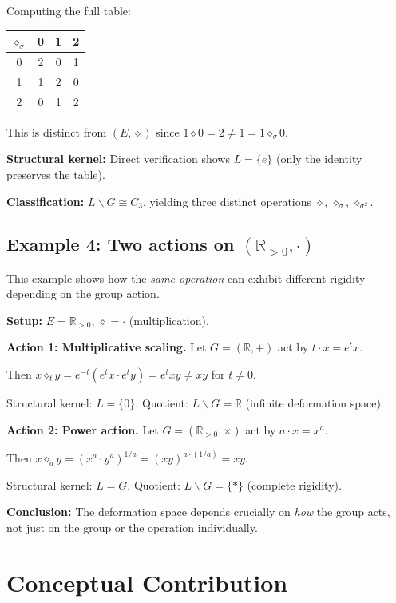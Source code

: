 \documentclass[11pt,a4paper]{article}
\begin{document}
	Computing the full table:
	\begin{center}
		\begin{tabular}{c|ccc}
			$\diamond_\sigma$ & 0 & 1 & 2 \\ \hline
			0 & 2 & 0 & 1 \\
			1 & 1 & 2 & 0 \\
			2 & 0 & 1 & 2
		\end{tabular}
	\end{center}
	
	This is distinct from $(E, \diamond)$ since $1 \diamond 0 = 2 \neq 1 = 1 \diamond_\sigma 0$.
	
	\textbf{Structural kernel:} Direct verification shows $L = \{e\}$ (only the identity preserves the table).
	
	\textbf{Classification:} $L\backslash G \cong C_3$, yielding three distinct operations $\diamond$, $\diamond_\sigma$, $\diamond_{\sigma^2}$.
	
	\subsection{Example 4: Two actions on $(\mathbb{R}_{>0}, \cdot)$}
	
	This example shows how the \emph{same operation} can exhibit different rigidity depending on the group action.
	
	\textbf{Setup:} $E = \mathbb{R}_{>0}$, $\diamond = \cdot$ (multiplication).
	
	\textbf{Action 1: Multiplicative scaling.} Let $G = (\mathbb{R}, +)$ act by $t \cdot x = e^t x$.
	
	Then $x \diamond_t y = e^{-t}(e^t x \cdot e^t y) = e^t xy \neq xy$ for $t \neq 0$.
	
	Structural kernel: $L = \{0\}$. Quotient: $L\backslash G = \mathbb{R}$ (infinite deformation space).
	
	\textbf{Action 2: Power action.} Let $G = (\mathbb{R}_{>0}, \times)$ act by $a \cdot x = x^a$.
	
	Then $x \diamond_a y = (x^a \cdot y^a)^{1/a} = (xy)^{a \cdot (1/a)} = xy$.
	
	Structural kernel: $L = G$. Quotient: $L\backslash G = \{*\}$ (complete rigidity).
	
	\textbf{Conclusion:} The deformation space depends crucially on \emph{how} the group acts, not just on the group or the operation individually.
	
	\section{Conceptual Contribution}
	
\end{document}
